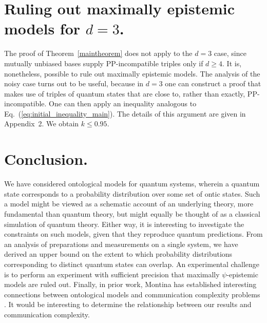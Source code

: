 \section*{Ruling out maximally epistemic models for $d=3$.}
The proof of Theorem~\ref{maintheorem} does not apply to the $d=3$ case, since mutually unbiased bases supply PP-incompatible triples only if $d\ge4$. It is, nonetheless, possible to rule out maximally epistemic models. The analysis of the noisy case turns out to be useful, because in $d=3$ one can construct a proof that makes use of triples of quantum states that are close to, rather than exactly, PP-incompatible. One can then apply an inequality analogous to Eq.~(\ref{eq:initial_inequality_main}). The details of this argument are given in Appendix~2. We obtain $k \leq 0.95$.

\section*{Conclusion.} We have considered ontological models for quantum systems, wherein a quantum state corresponds to a probability distribution over some set of ontic states. Such a model might be viewed as a schematic account of an underlying theory, more fundamental than quantum theory, but might equally be thought of as a classical simulation of quantum theory. Either way, it is interesting to investigate the constraints on such models, given that they reproduce quantum predictions. From an analysis of preparations and measurements on a single system, we have derived an upper bound on the extent to which probability distributions corresponding to distinct quantum states can overlap. An experimental challenge is to perform an experiment with sufficient precision that maximally $\psi$-epistemic models are ruled out. Finally, in prior work, Montina has established interesting connections between ontological models and communication complexity problems \cite{Montina2012}. It would be interesting to determine the relationship between our results and communication complexity.  
